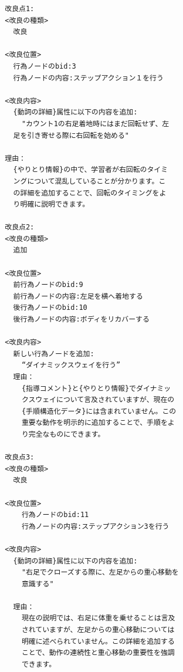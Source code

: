 \begin{tcolorbox}[breakable, colback=white, colframe=black]
    \begin{verbatim}
        改良点1:
        <改良の種類>
          改良
        
        <改良位置>
          行為ノードのbid:3
          行為ノードの内容:ステップアクション１を行う
        
        <改良内容>
          {動詞の詳細}属性に以下の内容を追加:
            "カウント1の右足着地時にはまだ回転せず、左
          足を引き寄せる際に右回転を始める"
         
        理由：
          {やりとり情報}の中で、学習者が右回転のタイミ
          ングについて混乱していることが分かります。こ
          の詳細を追加することで、回転のタイミングをよ
          り明確に説明できます。
        
        改良点2:
        <改良の種類>
          追加
        
        <改良位置>
          前行為ノードのbid:9
          前行為ノードの内容:左足を横へ着地する
          後行為ノードのbid:10
          後行為ノードの内容:ボディをリカバーする
        
        <改良内容>
          新しい行為ノードを追加:
            “ダイナミックスウェイを行う”
          理由：
            {指導コメント}と{やりとり情報}でダイナミッ
            クスウェイについて言及されていますが、現在の
            {手順構造化データ}には含まれていません。この
            重要な動作を明示的に追加することで、手順をよ
            り完全なものにできます。
        
        改良点3:
        <改良の種類>
          改良
        
        <改良位置>
            行為ノードのbid:11
            行為ノードの内容:ステップアクション3を行う
        
        <改良内容>
          {動詞の詳細}属性に以下の内容を追加:
            "右足でクローズする際に、左足からの重心移動を
            意識する"
         
          理由：
            現在の説明では、右足に体重を乗せることは言及
            されていますが、左足からの重心移動については
            明確に述べられていません。この詳細を追加する
            ことで、動作の連続性と重心移動の重要性を強調
            できます。
    \end{verbatim}
\end{tcolorbox}
    
\label{fig16}



